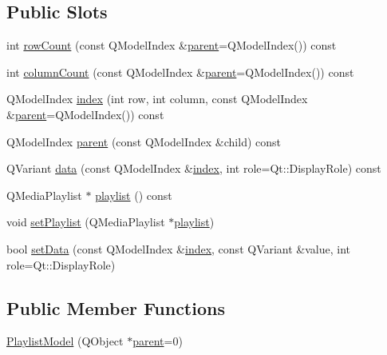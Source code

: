 \subsection*{Public Slots}
\begin{DoxyCompactItemize}
\item 
int \hyperlink{class_playlist_model_a2deef5b14f8f66431a55fdb0484025b6}{row\-Count} (const Q\-Model\-Index \&\hyperlink{class_playlist_model_a8ff71ee8d706da034fbe8b9b613a940c}{parent}=Q\-Model\-Index()) const 
\item 
int \hyperlink{class_playlist_model_a50cd819e7dec4c4881eebaed8130944d}{column\-Count} (const Q\-Model\-Index \&\hyperlink{class_playlist_model_a8ff71ee8d706da034fbe8b9b613a940c}{parent}=Q\-Model\-Index()) const 
\item 
Q\-Model\-Index \hyperlink{class_playlist_model_a03d1879138b2a0c6c68d7f6d98cfa92a}{index} (int row, int column, const Q\-Model\-Index \&\hyperlink{class_playlist_model_a8ff71ee8d706da034fbe8b9b613a940c}{parent}=Q\-Model\-Index()) const 
\item 
Q\-Model\-Index \hyperlink{class_playlist_model_a8ff71ee8d706da034fbe8b9b613a940c}{parent} (const Q\-Model\-Index \&child) const 
\item 
Q\-Variant \hyperlink{class_playlist_model_ac3d2bee2441ad8d13662833fd5968aac}{data} (const Q\-Model\-Index \&\hyperlink{class_playlist_model_a03d1879138b2a0c6c68d7f6d98cfa92a}{index}, int role=Qt\-::\-Display\-Role) const 
\item 
Q\-Media\-Playlist $\ast$ \hyperlink{class_playlist_model_afe7dce718749f036b23a8cf749dc4388}{playlist} () const 
\item 
void \hyperlink{class_playlist_model_aaf551c97c7a8ded2a3d3333f15f558a5}{set\-Playlist} (Q\-Media\-Playlist $\ast$\hyperlink{class_playlist_model_afe7dce718749f036b23a8cf749dc4388}{playlist})
\item 
bool \hyperlink{class_playlist_model_a61fcc4b9d0eaad86492c283b05c30fbc}{set\-Data} (const Q\-Model\-Index \&\hyperlink{class_playlist_model_a03d1879138b2a0c6c68d7f6d98cfa92a}{index}, const Q\-Variant \&value, int role=Qt\-::\-Display\-Role)
\end{DoxyCompactItemize}
\subsection*{Public Member Functions}
\begin{DoxyCompactItemize}
\item 
\hyperlink{class_playlist_model_a62aaf86821f96310da890e94ff083cb8}{Playlist\-Model} (Q\-Object $\ast$\hyperlink{class_playlist_model_a8ff71ee8d706da034fbe8b9b613a940c}{parent}=0)
\end{DoxyCompactItemize}


